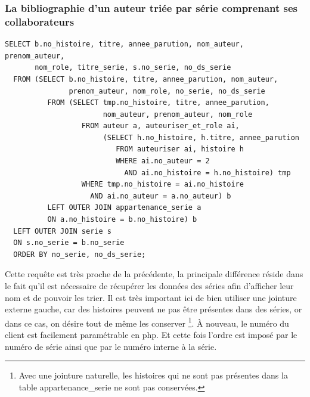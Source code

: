 \documentclass[12pt]{article}
\begin{document}
\subsubsection*{La bibliographie d'un auteur triée par série
comprenant ses collaborateurs}
\begin{lstlisting}
SELECT b.no_histoire, titre, annee_parution, nom_auteur, prenom_auteur,
       nom_role, titre_serie, s.no_serie, no_ds_serie
  FROM (SELECT b.no_histoire, titre, annee_parution, nom_auteur,
               prenom_auteur, nom_role, no_serie, no_ds_serie
          FROM (SELECT tmp.no_histoire, titre, annee_parution,
                       nom_auteur, prenom_auteur, nom_role
                  FROM auteur a, auteuriser_et_role ai,
                       (SELECT h.no_histoire, h.titre, annee_parution
                          FROM auteuriser ai, histoire h
                          WHERE ai.no_auteur = 2
                            AND ai.no_histoire = h.no_histoire) tmp
                  WHERE tmp.no_histoire = ai.no_histoire
                    AND ai.no_auteur = a.no_auteur) b
          LEFT OUTER JOIN appartenance_serie a
          ON a.no_histoire = b.no_histoire) b
  LEFT OUTER JOIN serie s
  ON s.no_serie = b.no_serie
  ORDER BY no_serie, no_ds_serie;
\end{lstlisting}
Cette requête est très proche de la précédente, la principale différence
réside dans le fait qu'il est nécessaire de récupérer les données des séries
afin d'afficher leur nom et de pouvoir les trier. Il est très important ici
de bien utiliser une jointure externe gauche, car des histoires peuvent ne
pas être présentes dans des séries, or dans ce cas, on désire tout de même
les conserver \footnote{Avec une jointure naturelle, les histoires qui ne
sont pas présentes dans la table appartenance\_serie ne sont pas
conservées.}. À nouveau, le numéro du client est facilement paramétrable en
php. Et cette fois l'ordre est imposé par le numéro de série ainsi que par le
numéro interne à la série.
\end{document}
